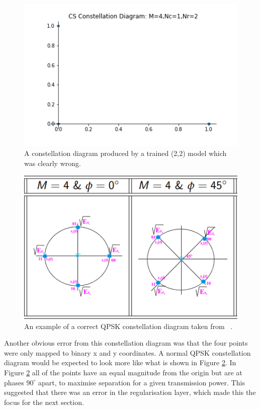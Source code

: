 \documentclass[12pt,onecolumn,letterpaper]{article}
\newcommand\genfigsize{0.5}
\begin{document}
\begin{figure}[t]
   \centering
   \includegraphics[width=\genfigsize\linewidth]{figures/wrong_constellation_diagram.png}
   \caption{A constellation diagram produced by a trained (2,2) model which was clearly wrong. }
\label{fig:WrongConstellationDiagram}
\end{figure}

\begin{figure}[t]
   \centering
   \includegraphics[width=\genfigsize\linewidth]{figures/EE3-03_comms_systems_qpsk_constellation_diagram.PNG}
   \caption{An example of a correct QPSK constellation diagram taken from ~\cite{EE3CommsSystemsNotesL4}. }
\label{fig:CommsSystemsConstelDiagEg}
\end{figure}

Another obvious error from this constellation diagram was that the four points were only mapped to binary x and y coordinates. A normal QPSK constellation diagram would be expected to look more like what is shown in Figure \ref{fig:CommsSystemsConstelDiagEg}. In Figure \ref{fig:CommsSystemsConstelDiagEg} all of the points have an equal magnitude from the origin but are at phases $90^{\circ}$ apart, to maximise separation for a given transmission power. This suggested that there was an error in the regularisation layer, which made this the focus for the next section. 
\end{document}
